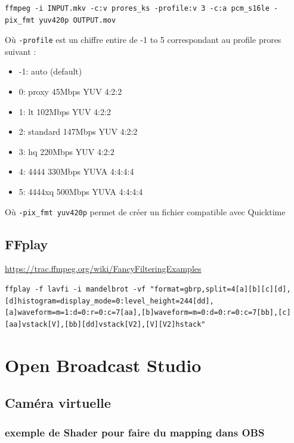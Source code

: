 \documentclass[
]{book}
\providecommand{\tightlist}{%
  \setlength{\itemsep}{0pt}\setlength{\parskip}{0pt}}
\begin{document}
\begin{verbatim}
ffmpeg -i INPUT.mkv -c:v prores_ks -profile:v 3 -c:a pcm_s16le -pix_fmt yuv420p OUTPUT.mov
\end{verbatim}

Où \texttt{-profile} est un chiffre entire de -1 to 5 correspondant au profile prores suivant :

\begin{itemize}
\tightlist
\item
  -1: auto (default)
\item
  0: proxy 45Mbps YUV 4:2:2
\item
  1: lt 102Mbps YUV 4:2:2
\item
  2: standard 147Mbps YUV 4:2:2
\item
  3: hq 220Mbps YUV 4:2:2
\item
  4: 4444 330Mbps YUVA 4:4:4:4
\item
  5: 4444xq 500Mbps YUVA 4:4:4:4
\end{itemize}

Où \texttt{-pix\_fmt\ yuv420p} permet de créer un fichier compatible avec Quicktime

\hypertarget{ffplay}{%
\section{FFplay}\label{ffplay}}

\url{https://trac.ffmpeg.org/wiki/FancyFilteringExamples}

\begin{verbatim}
ffplay -f lavfi -i mandelbrot -vf "format=gbrp,split=4[a][b][c][d],[d]histogram=display_mode=0:level_height=244[dd],[a]waveform=m=1:d=0:r=0:c=7[aa],[b]waveform=m=0:d=0:r=0:c=7[bb],[c][aa]vstack[V],[bb][dd]vstack[V2],[V][V2]hstack"
\end{verbatim}

\hypertarget{obs}{%
\chapter{Open Broadcast Studio}\label{obs}}

\hypertarget{camuxe9ra-virtuelle-1}{%
\section{Caméra virtuelle}\label{camuxe9ra-virtuelle-1}}

\hypertarget{exemple-de-shader-pour-faire-du-mapping-dans-obs}{%
\subsection{exemple de Shader pour faire du mapping dans OBS}\label{exemple-de-shader-pour-faire-du-mapping-dans-obs}}
\end{document}
